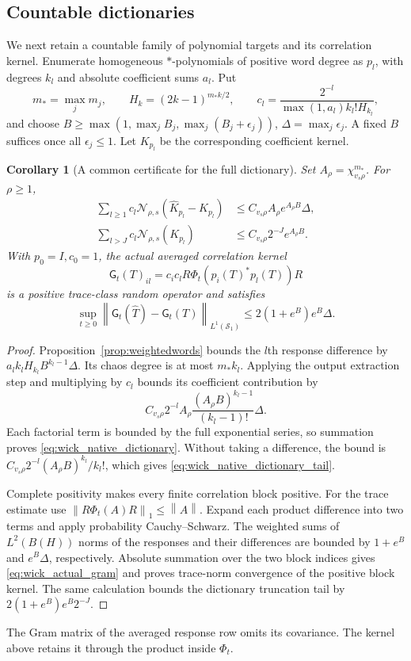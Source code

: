 \documentclass[11pt,a4paper]{amsart}
\numberwithin{equation}{section}
\newtheorem{corollary}[theorem]{Corollary}
\theoremstyle{definition}
\theoremstyle{remark}
\newcommand{\Sch}{\mathcal S}
\newcommand{\norm}[1]{\left\lVert#1\right\rVert}
\newcommand{\Nn}[2]{\mathcal N_{#1,s}(#2)}
\begin{document}
\subsection{Countable dictionaries}
We next retain a countable family of polynomial targets and its correlation kernel. Enumerate homogeneous $*$-polynomials of positive word degree as $p_l$, with degrees $k_l$ and absolute coefficient sums $a_l$. Put
\[
 m_* =\max_jm_j,\qquad H_k=(2k-1)^{m_*k/2},\qquad
 c_l=\frac{2^{-l}}{\max(1,a_l)k_l!H_{k_l}},
\]
and choose
$B\ge\max(1,\max_jB_j,\max_j(B_j+\epsilon_j))$,
$\Delta=\max_j\epsilon_j$.
A fixed $B$ suffices once all $\epsilon_j\le1$. Let $K_{p_l}$ be the corresponding coefficient kernel.
\begin{corollary}[A common certificate for the full dictionary]\label{cor:wick_dictionary}
Set $A_\rho=\chi_{v_s\rho}^{m_*}$. For $\rho\ge1$,
\begin{align}
 \sum_{l\ge1}c_l\Nn\rho{\widehat K_{p_l}-K_{p_l}}
 &\le C_{v_s\rho}A_\rho e^{A_\rho B}\Delta,\label{eq:wick_native_dictionary}\\
 \sum_{l>J}c_l\Nn\rho{K_{p_l}}
 &\le C_{v_s\rho}2^{-J}e^{A_\rho B}.\label{eq:wick_native_dictionary_tail}
\end{align}
With $p_0=I,c_0=1$, the actual averaged correlation kernel
\[
 \mathsf G_t(T)_{il}=c_ic_lR\Phi_t(p_i(T)^*p_l(T))R
\]
is a positive trace-class random operator and satisfies
\begin{equation}\label{eq:wick_actual_gram}
 \sup_{t\ge0}\norm{\mathsf G_t(\widehat T)-\mathsf G_t(T)}_{L^1(\Sch_1)}
 \le2(1+e^B)e^B\Delta.
\end{equation}
\end{corollary}
\begin{proof}
Proposition~\ref{prop:weightedwords} bounds the $l$th response difference by
$a_lk_lH_{k_l}B^{k_l-1}\Delta$.
Its chaos degree is at most $m_*k_l$. Applying the output extraction step and multiplying by $c_l$ bounds its coefficient contribution by
\[
 C_{v_s\rho}2^{-l}A_\rho
       \frac{(A_\rho B)^{k_l-1}}{(k_l-1)!}\Delta.
\]
Each factorial term is bounded by the full exponential series, so summation proves \eqref{eq:wick_native_dictionary}. Without taking a difference, the bound is
$C_{v_s\rho}2^{-l}(A_\rho B)^{k_l}/k_l!$,
which gives \eqref{eq:wick_native_dictionary_tail}.

Complete positivity makes every finite correlation block positive. For the trace estimate use $\norm{R\Phi_t(A)R}_1\le\norm A$. Expand each product difference into two terms and apply probability Cauchy--Schwarz. The weighted sums of $L^2(B(H))$ norms of the responses and their differences are bounded by $1+e^B$ and $e^B\Delta$, respectively. Absolute summation over the two block indices gives \eqref{eq:wick_actual_gram} and proves trace-norm convergence of the positive block kernel. The same calculation bounds the dictionary truncation tail by $2(1+e^B)e^B2^{-J}$.
\end{proof}
The Gram matrix of the averaged response row omits its covariance. The kernel above retains it through the product inside $\Phi_t$.
\end{document}
